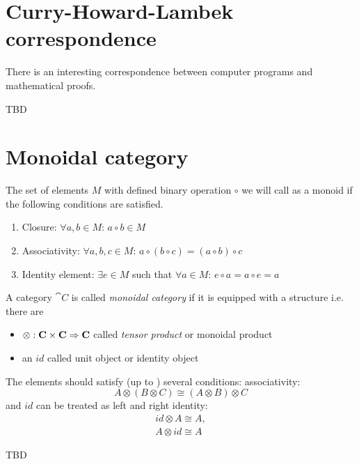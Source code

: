 \section{Curry-Howard-Lambek correspondence}
There is an interesting correspondence between computer programs and
mathematical proofs.

TBD

\section{Monoidal category}
\begin{definition}[Monoid]
  \label{def:monoid}
  The set of elements $M$ with defined binary operation $\circ$ we will call
  as a monoid if the following conditions are satisfied.
  \begin{enumerate}
  \item Closure: $\forall a, b \in M$: $a \circ b \in M$
  \item Associativity: $\forall a, b, c \in M$:
    $a \circ \left( b \circ c \right) =
    \left( a \circ b \right) \circ c$
  \item Identity element: $\exists e \in M$ such that
    $\forall a \in M$: $e \circ a = a \circ e = a$
  \end{enumerate}
\end{definition}

\begin{definition}
\label{def:monoidal_category}
A category $\cat{C}$ is called \textit{monoidal category} if it is
equipped with a  structure i.e. there are
\begin{itemize}
\item {} $\otimes: \mathbf{C} \times \mathbf{C} \Rightarrow
  \mathbf{C}$ called \textit{tensor product} or monoidal product
\item an  $id$ called unit object or identity object
\end{itemize}

The elements should satisfy (up to ) several conditions:
associativity: 
\begin{equation}
A \otimes \left( B \otimes C \right) \cong
  \left( A \otimes B \right) \otimes C
\nonumber
\end{equation}
and $id$ can be treated as left and right identity: 
\begin{eqnarray}
id \otimes A \cong A, 
\nonumber \\
A \otimes id \cong A
\nonumber
\end{eqnarray}
\end{definition}
TBD

